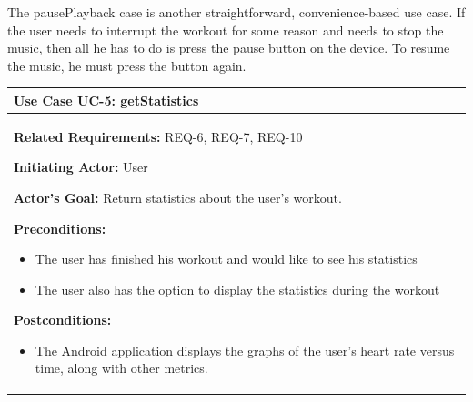 \documentclass[letterpaper,english, 12pt]{scrreprt}
\begin{document}
The pausePlayback case is another straightforward, convenience-based use case. If the user needs to interrupt the workout for some reason and needs to stop the music, then all he has to do is press the pause button on the device. To resume the music, he must press the button again.

\begin{center}
        \begin{tabular}{|C{15cm}|}
                \hline
                        \textbf{Use Case UC-5: getStatistics}\\
                \hline
                        \begin{flushleft}
                                \textbf{Related Requirements: } REQ-6, REQ-7, REQ-10
                        \end{flushleft}
                        \begin{flushleft}
                                \textbf{Initiating Actor: } User
                        \end{flushleft}
                        \begin{flushleft}
                                \textbf{Actor's Goal: } Return statistics about the user's workout.
                        \end{flushleft}
                        \begin{flushleft}
                                \textbf{Preconditions: }
                        \end{flushleft}
                                \begin{itemize}
                                        \item The user has finished his workout and would like to see his statistics
                                        \item The user also has the option to display the statistics during the workout
                                \end{itemize}
                        \begin{flushleft}
                                \textbf{Postconditions: }
                        \end{flushleft}
                                \begin{itemize}
                                        \item The Android application displays the graphs of the user's heart rate versus time, along with other metrics.
                                \end{itemize}

\end{tabular}
\end{center}
\end{document}
